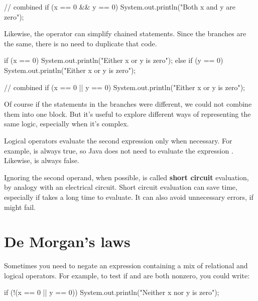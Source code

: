 \begin{code}
// combined
if (x == 0 && y == 0) {
    System.out.println("Both x and y are zero");
}
\end{code}

Likewise, the \java{||} operator can simplify chained  statements.
Since the branches are the same, there is no need to duplicate that code.

\begin{code}
if (x == 0) {
    System.out.println("Either x or y is zero");
} else if (y == 0) {
    System.out.println("Either x or y is zero");
}
\end{code}

\begin{code}
// combined
if (x == 0 || y == 0) {
    System.out.println("Either x or y is zero");
}
\end{code}

Of course if the statements in the branches were different, we could not combine them into one block.
But it's useful to explore different ways of representing the same logic, especially when it's complex.


Logical operators evaluate the second expression only when necessary.
For example,  is always true, so Java does not need to evaluate the expression .
Likewise,  is always false.

Ignoring the second operand, when possible, is called {\bf short circuit} evaluation, by analogy with an electrical circuit.
Short circuit evaluation can save time, especially if  takes a long time to evaluate.
It can also avoid unnecessary errors, if  might fail.


\section{De Morgan's laws}

Sometimes you need to negate an expression containing a mix of relational and logical operators.
For example, to test if  and  are both nonzero, you could write:

\begin{code}
if (!(x == 0 || y == 0)) {
    System.out.println("Neither x nor y is zero");
}
\end{code}


